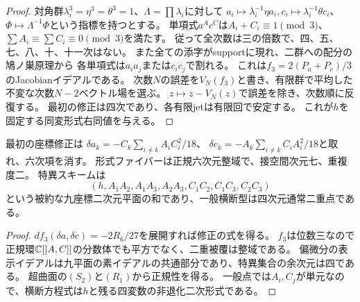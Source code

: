 \begin{proof}
対角群$\lambda_i^3=\eta^3=\theta^3=1$、$\Lambda=\prod\lambda_i$に対して
$a_i\mapsto\lambda_i^{-1}\eta a_i,c_i\mapsto\lambda_i^{-1}\theta c_i$、
$\Phi\mapsto\Lambda^{-1}\Phi$という指標を持つとする。
単項式$a^Ac^C$は$A_i+C_i\equiv1\pmod3$、$\sum A_i\equiv\sum C_i\equiv0\pmod3$を満たす。
従って全次数は三の倍数で、四、五、七、八、十、十一次はない。
また全ての添字がsupportに現れ、二群への配分の鳩ノ巣原理から
各単項式は$a_ia_j$または$c_ic_j$で割れる。
これは$f_3=2(P_a+P_c)/3$のJacobianイデアルである。
次数$N$の誤差を$V_N(f_3)$と書き、有限群で平均した不変な次数$N-2$ベクトル場を選ぶ。
$z\mapsto z-V_N(z)$で誤差を除き、次数順に反復する。
最初の修正は四次であり、各有限jetは有限回で安定する。
これが$h$を固定する同変形式右同値を与える。
\end{proof}

\begin{corollary}
最初の座標修正は
$\delta a_k=-C_k\sum_{i\ne k}A_iC_i^2/18$、
$\delta c_k=-A_k\sum_{i\ne k}C_iA_i^2/18$と取れ、六次項を消す。
形式ファイバーは正規六次元整域で、接空間次元七、重複度二。
特異スキームは
\[
 (h,A_1A_2,A_1A_3,A_2A_3,C_1C_2,C_1C_3,C_2C_3)
\]
という被約な九座標二次元平面の和であり、一般横断型は四次元通常二重点である。
\end{corollary}
\begin{proof}
$df_3(\delta a,\delta c)=-2R_6/27$を展開すれば修正の式を得る。
$f_3$は位数三なので正規環$\mathbb C[[A,C]]$の分数体でも平方でなく、二重被覆は整域である。
偏微分の表示イデアルは九平面の素イデアルの共通部分であり、特異集合の余次元は四である。
超曲面の$(S_2)$と$(R_1)$から正規性を得る。
一般点では$A_i,C_j$が単元なので、横断方程式は$h$と残る四変数の非退化二次形式である。
\end{proof}
